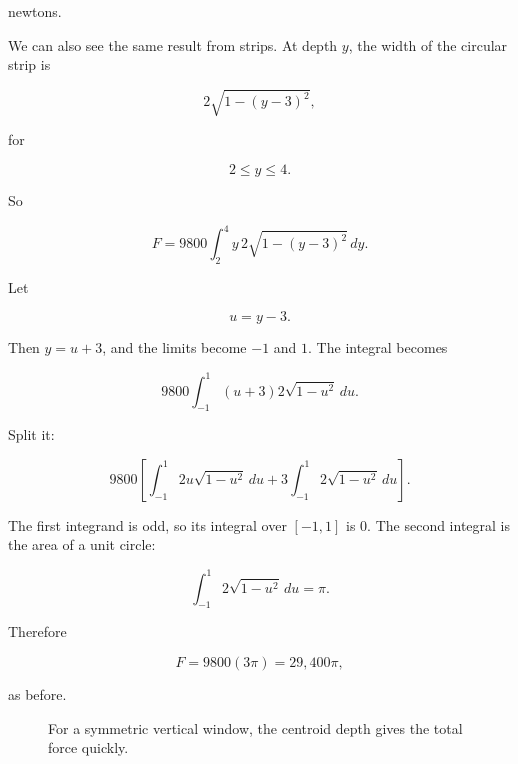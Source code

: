 newtons.

We can also see the same result from strips.  At depth \(y\), the width of the circular
strip is

\[
2\sqrt{1-(y-3)^2},
\]

for

\[
2\le y\le4.
\]

So

\[
F=9800\int_2^4 y\,2\sqrt{1-(y-3)^2}\,dy.
\]

Let

\[
u=y-3.
\]

Then \(y=u+3\), and the limits become \(-1\) and \(1\).  The integral becomes

\[
9800\int_{-1}^1 (u+3)2\sqrt{1-u^2}\,du.
\]

Split it:

\[
9800\left[
\int_{-1}^1 2u\sqrt{1-u^2}\,du
+
3\int_{-1}^1 2\sqrt{1-u^2}\,du
\right].
\]

The first integrand is odd, so its integral over \([-1,1]\) is \(0\).  The second integral
is the area of a unit circle:

\[
\int_{-1}^1 2\sqrt{1-u^2}\,du=\pi.
\]

Therefore

\[
F=9800(3\pi)=29{,}400\pi,
\]

as before.

\begin{figure}[h]
\centering
{}
\caption{For a symmetric vertical window, the centroid depth gives the total force quickly.}
\label{fig:hydrostatic-circular-window}
\end{figure}


